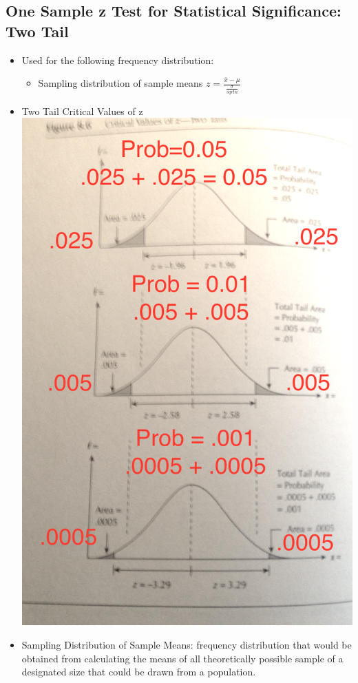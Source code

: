 \documentclass[]{article}
\begin{document}
\subsection{One Sample z Test for Statistical Significance: Two
Tail}\label{one-sample-z-test-for-statistical-significance-two-tail}

\begin{itemize}
\itemsep1pt\parskip0pt
\item
  Used for the following frequency distribution:

  \begin{itemize}
  \itemsep1pt\parskip0pt
  \item
    Sampling distribution of sample means
    $z = \frac{\bar{x}-\mu}{\frac{\sigma}{sqrt{n}}}$
  \end{itemize}
\item
  Two Tail Critical Values of z \includegraphics{z2tails.png}
\item
  Sampling Distribution of Sample Means: frequency distribution that
  would be obtained from calculating the means of all theoretically
  possible sample of a designated size that could be drawn from a
  population.
\end{itemize}
\end{document}

